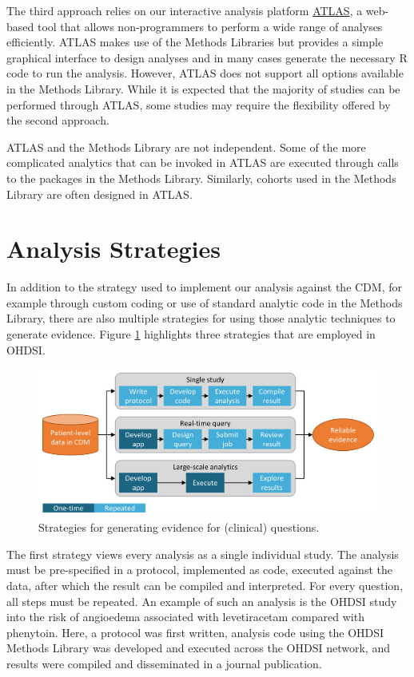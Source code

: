 \documentclass[11pt]{book}
\theoremstyle{definition}
\theoremstyle{definition}
\theoremstyle{definition}
\theoremstyle{remark}
\begin{document}
The third approach relies on our interactive analysis platform
\href{https://github.com/OHDSI/Atlas/wiki}{ATLAS}, a web-based tool that
allows non-programmers to perform a wide range of analyses efficiently.
ATLAS makes use of the Methods Libraries but provides a simple graphical
interface to design analyses and in many cases generate the necessary R
code to run the analysis. However, ATLAS does not support all options
available in the Methods Library. While it is expected that the majority
of studies can be performed through ATLAS, some studies may require the
flexibility offered by the second approach.

ATLAS and the Methods Library are not independent. Some of the more
complicated analytics that can be invoked in ATLAS are executed through
calls to the packages in the Methods Library. Similarly, cohorts used in
the Methods Library are often designed in ATLAS.

\section{Analysis Strategies}\label{analysis-strategies}

In addition to the strategy used to implement our analysis against the
CDM, for example through custom coding or use of standard analytic code
in the Methods Library, there are also multiple strategies for using
those analytic techniques to generate evidence. Figure
\ref{fig:strategies} highlights three strategies that are employed in
OHDSI.

\begin{figure}

{\centering \includegraphics[width=0.9\linewidth]{images/OhdsiAnalyticsTools/strategies} 

}

\caption{Strategies for generating evidence for (clinical) questions.}\label{fig:strategies}
\end{figure}

The first strategy views every analysis as a single individual study.
The analysis must be pre-specified in a protocol, implemented as code,
executed against the data, after which the result can be compiled and
interpreted. For every question, all steps must be repeated. An example
of such an analysis is the OHDSI study into the risk of angioedema
associated with levetiracetam compared with phenytoin. \citep{duke_2017}
Here, a protocol was first written, analysis code using the OHDSI
Methods Library was developed and executed across the OHDSI network, and
results were compiled and disseminated in a journal publication.
\end{document}
